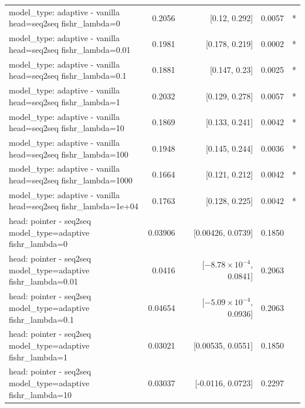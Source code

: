 \documentclass[10pt]{article}
\makeatletter
\newcommand{\stackcell}[1]{\begin{tabular}[t]{@{}l@{}}#1\end{tabular}}
\makeatother
\begin{document}
{\begin{longtable}{lrrrl}
\stackcell{model\_type: adaptive - vanilla\\\footnotesize head=seq2seq fishr\_lambda=0 } & 0.2056 & [0.12, 0.292] & 0.0057 & *\\
\stackcell{model\_type: adaptive - vanilla\\\footnotesize head=seq2seq fishr\_lambda=0.01 } & 0.1981 & [0.178, 0.219] & 0.0002 & *\\
\stackcell{model\_type: adaptive - vanilla\\\footnotesize head=seq2seq fishr\_lambda=0.1 } & 0.1881 & [0.147, 0.23] & 0.0025 & *\\
\stackcell{model\_type: adaptive - vanilla\\\footnotesize head=seq2seq fishr\_lambda=1 } & 0.2032 & [0.129, 0.278] & 0.0057 & *\\
\stackcell{model\_type: adaptive - vanilla\\\footnotesize head=seq2seq fishr\_lambda=10 } & 0.1869 & [0.133, 0.241] & 0.0042 & *\\
\stackcell{model\_type: adaptive - vanilla\\\footnotesize head=seq2seq fishr\_lambda=100 } & 0.1948 & [0.145, 0.244] & 0.0036 & *\\
\stackcell{model\_type: adaptive - vanilla\\\footnotesize head=seq2seq fishr\_lambda=1000 } & 0.1664 & [0.121, 0.212] & 0.0042 & *\\
\stackcell{model\_type: adaptive - vanilla\\\footnotesize head=seq2seq fishr\_lambda=1e+04 } & 0.1763 & [0.128, 0.225] & 0.0042 & *\\
\stackcell{head: pointer - seq2seq\\\footnotesize model\_type=adaptive fishr\_lambda=0 } & 0.03906 & [0.00426, 0.0739] & 0.1850 & \\
\stackcell{head: pointer - seq2seq\\\footnotesize model\_type=adaptive fishr\_lambda=0.01 } & 0.0416 & [$-8.78\times10^{-4}$, 0.0841] & 0.2063 & \\
\stackcell{head: pointer - seq2seq\\\footnotesize model\_type=adaptive fishr\_lambda=0.1 } & 0.04654 & [$-5.09\times10^{-4}$, 0.0936] & 0.2063 & \\
\stackcell{head: pointer - seq2seq\\\footnotesize model\_type=adaptive fishr\_lambda=1 } & 0.03021 & [0.00535, 0.0551] & 0.1850 & \\
\stackcell{head: pointer - seq2seq\\\footnotesize model\_type=adaptive fishr\_lambda=10 } & 0.03037 & [-0.0116, 0.0723] & 0.2297 & \\

\end{longtable}}
\end{document}
